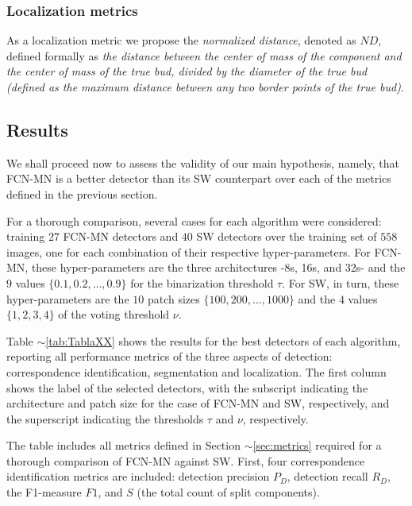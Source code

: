 \documentclass[a4paper,authoryear,review]{elsarticle}
\begin{document}
\subsubsection{Localization metrics}
\label{subsec:locmetrics}

As a localization metric we propose the \emph{normalized distance}, denoted as $ND$, defined formally as \emph{the distance between the center of mass of the component and the center of mass of the true bud, divided by the diameter of the true bud (defined as the maximum distance between any two border points of the true bud)}.

\subsection{Results}
\label{sec:resultados}

We shall proceed now to assess the validity of our main hypothesis, namely, that FCN-MN is a better detector than its SW counterpart over each of the metrics defined in the previous section. 

For a thorough comparison, several cases for each algorithm  were considered: training $27$ FCN-MN detectors and $40$ SW detectors over the training set of $558$ images, one for each combination of their respective hyper-parameters. For FCN-MN, these hyper-parameters are the three architectures -8s, 16s, and 32s- and the $9$ values $\{0.1, 0.2, \ldots, 0.9\}$ for the binarization threshold $\tau$. For SW, in turn, these hyper-parameters are the $10$ patch sizes $\{100, 200, \ldots, 1000\}$  and the $4$ values $\{1, 2, 3, 4\}$  of the voting threshold $\nu$.

Table $\sim$\ref{tab:TablaXX} shows the results for the best detectors of each algorithm, reporting all performance metrics of the three aspects of detection: correspondence identification, segmentation and localization. The first column shows the label of the selected detectors, with the subscript indicating the architecture and patch size for the case of FCN-MN and SW, respectively, and the superscript indicating the thresholds $\tau$ and $\nu$, respectively.

The table includes all metrics defined in Section $\sim$\ref{sec:metrics} required for a thorough comparison of FCN-MN against SW. First, four correspondence identification metrics are included: detection precision $P_D$, detection recall $R_D$, the F1-measure  $F1$, and $S$ (the total count of split components). 
\end{document}
